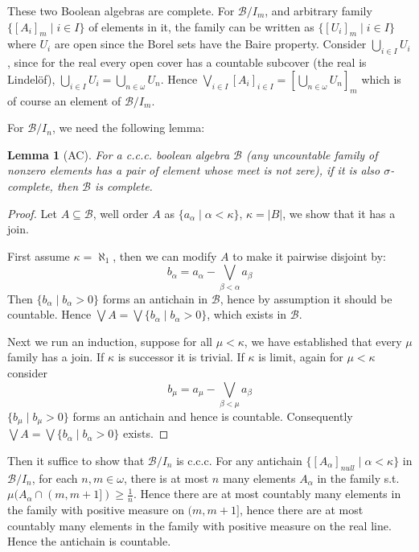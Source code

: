 \documentclass{article}
\newtheorem{lemma}{Lemma}
\begin{document}
These two Boolean algebras are complete. For $\mathcal{B}/I_m$, and arbitrary family $\{[A_i]_m\mid i\in I\}$ of elements in it, the family can be written as $\{[U_i]_m\mid i\in I\}$ where $U_i$ are open since the Borel sets have the Baire property. Consider $\bigcup_{i\in I}U_i$, since for the real every open cover has a countable subcover (the real is Lindel\"of), $\bigcup_{i\in I}U_i = \bigcup_{n\in \omega}U_n$. Hence $\bigvee_{i\in I} [A_i]_{i\in I} = [\bigcup_{n\in \omega}U_n]_m$ which is of course an element of $\mathcal{B}/I_m$.

For $\mathcal{B}/I_n$, we need the following lemma:

\begin{lemma}[AC]
    For a c.c.c. boolean algebra $\mathcal{B}$ (any uncountable family of nonzero elements has a pair of element whose meet is not zere), if it is also $\sigma$-complete, then $\mathcal{B}$ is complete.
\end{lemma}

\begin{proof}
    Let $A\subseteq \mathcal{B}$, well order $A$ as $\{a_\alpha\mid \alpha<\kappa\}$, $\kappa = |B|$, we show that it has a join. 

    First assume $\kappa = \aleph_1$, then we can modify $A$ to make it pairwise disjoint by: $$b_\alpha = a_\alpha - \bigvee_{\beta<\alpha}a_\beta$$
    Then $\{b_\alpha\mid b_\alpha > 0\}$ forms an antichain in $\mathcal{B}$, hence by assumption it should be countable. Hence $\bigvee A = \bigvee \{b_\alpha\mid b_\alpha > 0\}$, which exists in $\mathcal{B}$.

    Next we run an induction, suppose for all $\mu <\kappa$, we have established that every $\mu$ family has a join. If $\kappa$ is successor it is trivial. If $\kappa$ is limit, again for $\mu<\kappa$ consider $$b_\mu = a_\mu - \bigvee_{\beta<\mu}a_\beta$$
    $\{b_\mu\mid b_\mu > 0\}$ forms an antichain and hence is countable. Consequently $\bigvee A = \bigvee \{b_\alpha\mid b_\alpha > 0\}$ exists.
\end{proof}

Then it suffice to show that $\mathcal{B}/I_n$ is c.c.c. For any antichain $\{[A_\alpha]_{null}\mid \alpha<\kappa\}$ in $\mathcal{B}/I_n$, for each $n,m\in \omega$, there is at most $n$ many elements $A_\alpha$ in the family s.t. $\mu(A_\alpha\cap (m,m+1]) \geq \frac{1}{n}$. Hence there are at most countably many elements in the family with positive measure on $(m,m+1]$, hence there are at most countably many elements in the family with positive measure on the real line. Hence the antichain is countable.
\end{document}
